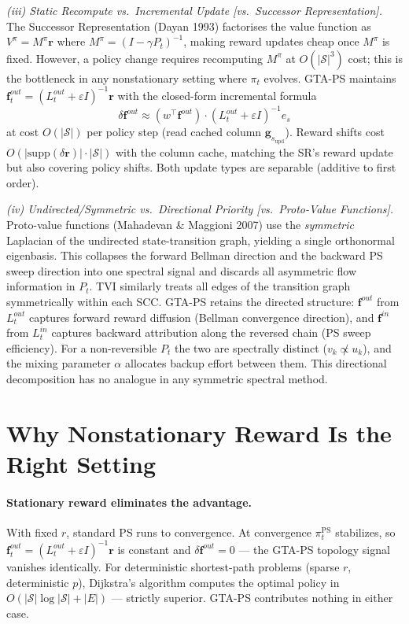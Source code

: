 \documentclass[10pt,a4paper]{article}
\begin{document}
\textit{(iii) Static Recompute vs.\ Incremental Update [vs.\ Successor Representation].}
The Successor Representation (Dayan 1993) factorises the value function as
$V^\pi = M^\pi \mathbf{r}$ where $M^\pi = (I-\gamma P_t)^{-1}$, making reward
updates cheap once $M^\pi$ is fixed.
However, a policy change requires recomputing $M^\pi$ at $O(|\mathcal{S}|^3)$ cost;
this is the bottleneck in any nonstationary setting where $\pi_t$ evolves.
GTA-PS maintains $\mathbf{f}^{out}_t = (L^{out}_t+\varepsilon I)^{-1}\mathbf{r}$
with the closed-form incremental formula
\[
  \delta\mathbf{f}^{out} \approx (w^\top\mathbf{f}^{out})\cdot(L^{out}_t+\varepsilon I)^{-1}e_s
\]
at cost $O(|\mathcal{S}|)$ per policy step (read cached column $\mathbf{g}_{s_\mathrm{upd}}$).
Reward shifts cost $O(|\mathrm{supp}(\delta\mathbf{r})|\cdot|\mathcal{S}|)$ with the
column cache, matching the SR's reward update but also covering policy shifts.
Both update types are separable (additive to first order).

\textit{(iv) Undirected/Symmetric vs.\ Directional Priority [vs.\ Proto-Value Functions].}
Proto-value functions (Mahadevan \& Maggioni 2007) use the \emph{symmetric} Laplacian
of the undirected state-transition graph, yielding a single orthonormal eigenbasis.
This collapses the forward Bellman direction and the backward PS sweep direction into
one spectral signal and discards all asymmetric flow information in $P_t$.
TVI similarly treats all edges of the transition graph symmetrically within each SCC.
GTA-PS retains the directed structure: $\mathbf{f}^{out}$ from $L^{out}_t$ captures
forward reward diffusion (Bellman convergence direction), and $\mathbf{f}^{in}$ from
$L^{in}_t$ captures backward attribution along the reversed chain (PS sweep efficiency).
For a non-reversible $P_t$ the two are spectrally distinct ($v_k \not\propto u_k$),
and the mixing parameter $\alpha$ allocates backup effort between them.
This directional decomposition has no analogue in any symmetric spectral method.




\section{Why Nonstationary Reward Is the Right Setting}

\paragraph{Stationary reward eliminates the advantage.}
With fixed $r$, standard PS runs to convergence.  At convergence $\pi^{\mathrm{PS}}_t$ stabilizes,
so $\mathbf{f}^{out}_t = (L^{out}_t+\varepsilon I)^{-1}\mathbf{r}$ is constant and
$\delta\mathbf{f}^{out} = 0$ --- the GTA-PS topology signal vanishes identically.
For deterministic shortest-path problems (sparse $r$, deterministic $p$), Dijkstra's
algorithm computes the optimal policy in $O(|\mathcal{S}|\log|\mathcal{S}|+|E|)$ ---
strictly superior.  GTA-PS contributes nothing in either case.
\end{document}
